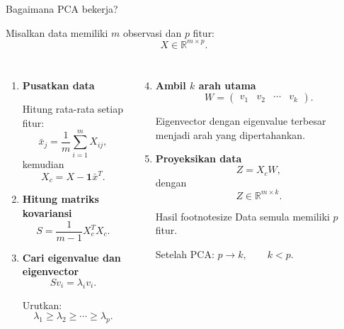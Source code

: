 \documentclass[aspectratio=169,11pt]{beamer}
\begin{document}
\begin{frame}{Bagaimana PCA bekerja?}
\footnotesize

Misalkan data memiliki $m$ observasi dan $p$ fitur:
\[
X\in\mathbb{R}^{m\times p}.
\]

\begin{columns}[T]


\begin{enumerate}
    \item \textbf{Pusatkan data}

    Hitung rata-rata setiap fitur:
    \[
    \bar{x}_j=\frac{1}{m}\sum_{i=1}^{m}X_{ij},
    \]
    kemudian
    \[
    X_c=X-\mathbf{1}\bar{x}^{T}.
    \]

    \pause

    \item \textbf{Hitung matriks kovariansi}
    \[
    S=\frac{1}{m-1}X_c^T X_c.
    \]

    \pause

    \item \textbf{Cari eigenvalue dan eigenvector}
    \[
    Sv_i=\lambda_i v_i.
    \]

    Urutkan:
    \[
    \lambda_1\geq\lambda_2\geq\cdots\geq\lambda_p.
    \]
\end{enumerate}


\begin{enumerate}
    \setcounter{enumi}{3}

    \pause
    \item \textbf{Ambil $k$ arah utama}
    \[
    W=
    \begin{pmatrix}
    v_1 & v_2 & \cdots & v_k
    \end{pmatrix}.
    \]

    Eigenvector dengan eigenvalue terbesar
    menjadi arah yang dipertahankan.

    \pause

    \item \textbf{Proyeksikan data}
    \[
    Z=X_cW,
    \]
    dengan
    \[
    Z\in\mathbb{R}^{m\times k}.
    \]

    \begin{block}{\footnotesize Hasil}
    footnotesize 
    Data semula memiliki $p$ fitur.

    Setelah PCA:
    \(
    p \longrightarrow k,
    \qquad k<p.
    \)
    \end{block}
\end{enumerate}

\end{columns}

\end{frame}
\end{document}
